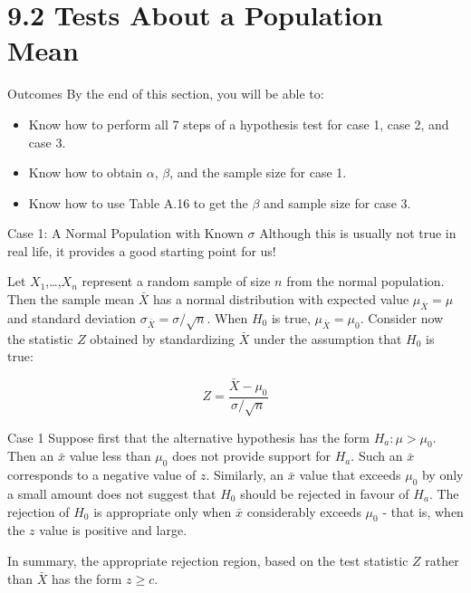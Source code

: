 \documentclass[
  ignorenonframetext,
]{beamer}
\providecommand{\tightlist}{%
  \setlength{\itemsep}{0pt}\setlength{\parskip}{0pt}}\usepackage{longtable,booktabs,array}
\begin{document}
\hypertarget{tests-about-a-population-mean}{%
\section{9.2 Tests About a Population
Mean}\label{tests-about-a-population-mean}}

\begin{frame}{Outcomes}
\protect\hypertarget{outcomes-1}{}
By the end of this section, you will be able to:

\begin{itemize}[<+->]
\tightlist
\item
  Know how to perform all 7 steps of a hypothesis test for case 1, case
  2, and case 3.
\item
  Know how to obtain \(\alpha\), \(\beta\), and the sample size for case
  1.
\item
  Know how to use Table A.16 to get the \(\beta\) and sample size for
  case 3.
\end{itemize}
\end{frame}

\begin{frame}{Case 1: A Normal Population with Known \(\sigma\)}
\protect\hypertarget{case-1-a-normal-population-with-known-sigma}{}
Although this is usually not true in real life, it provides a good
starting point for us!

Let \(X_{1}\),\ldots,\(X_{n}\) represent a random sample of size \(n\)
from the normal population. Then the sample mean \(\bar{X}\) has a
normal distribution with expected value \(\mu_{\bar{X}} = \mu\) and
standard deviation \(\sigma_{\bar{X}} = \sigma/\sqrt{n}\). When
\(H_{0}\) is true, \(\mu_{\bar{X}} = \mu_{0}\). Consider now the
statistic \(Z\) obtained by standardizing \(\bar{X}\) under the
assumption that \(H_{0}\) is true:

\[
Z = \frac{\bar{X} - \mu_{0}}{\sigma/\sqrt{n}}
\]
\end{frame}

\begin{frame}{Case 1}
\protect\hypertarget{case-1}{}
Suppose first that the alternative hypothesis has the form
\(H_{a}: \mu > \mu_{0}\). Then an \(\bar{x}\) value less than
\(\mu_{0}\) does not provide support for \(H_{a}\). Such an \(\bar{x}\)
corresponds to a negative value of \(z\). Similarly, an \(\bar{x}\)
value that exceeds \(\mu_{0}\) by only a small amount does not suggest
that \(H_{0}\) should be rejected in favour of \(H_{a}\). The rejection
of \(H_{0}\) is appropriate only when \(\bar{x}\) considerably exceeds
\(\mu_{0}\) - that is, when the \(z\) value is positive and large.

In summary, the appropriate rejection region, based on the test
statistic \(Z\) rather than \(\bar{X}\) has the form \(z \geq c\).
\end{frame}
\end{document}
